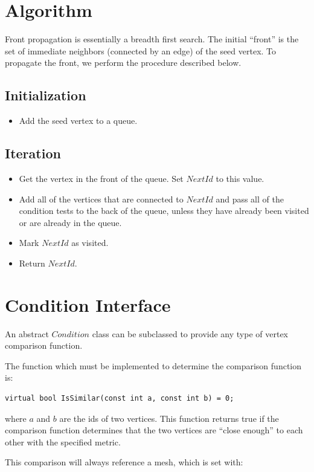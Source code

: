 \documentclass{InsightArticle}
\begin{document}
\section{Algorithm}
Front propagation is essentially a breadth first search. The initial ``front'' is the set of immediate neighbors (connected by an edge) of the seed vertex. To propagate the front, we perform the procedure described below.

\subsection{Initialization}
\begin{itemize}
\item Add the seed vertex to a queue.
\end{itemize}

\subsection{Iteration}
\begin{itemize}
\item Get the vertex in the front of the queue. Set $NextId$ to this value.
\item Add all of the vertices that are connected to $NextId$ and pass all of the condition tests to the back of the queue, unless they have already been visited or are already in the queue.
\item Mark $NextId$ as visited.
\item Return $NextId$.
\end{itemize}

\section{Condition Interface}
An abstract $Condition$ class can be subclassed to provide any type of vertex comparison function.

The function which must be implemented to determine the comparison function is:
\begin{verbatim}
virtual bool IsSimilar(const int a, const int b) = 0;
\end{verbatim}

where $a$ and $b$ are the ids of two vertices. This function returns true if the comparison function determines that the two vertices are ``close enough'' to each other with the specified metric.

This comparison will always reference a mesh, which is set with:
\end{document}
